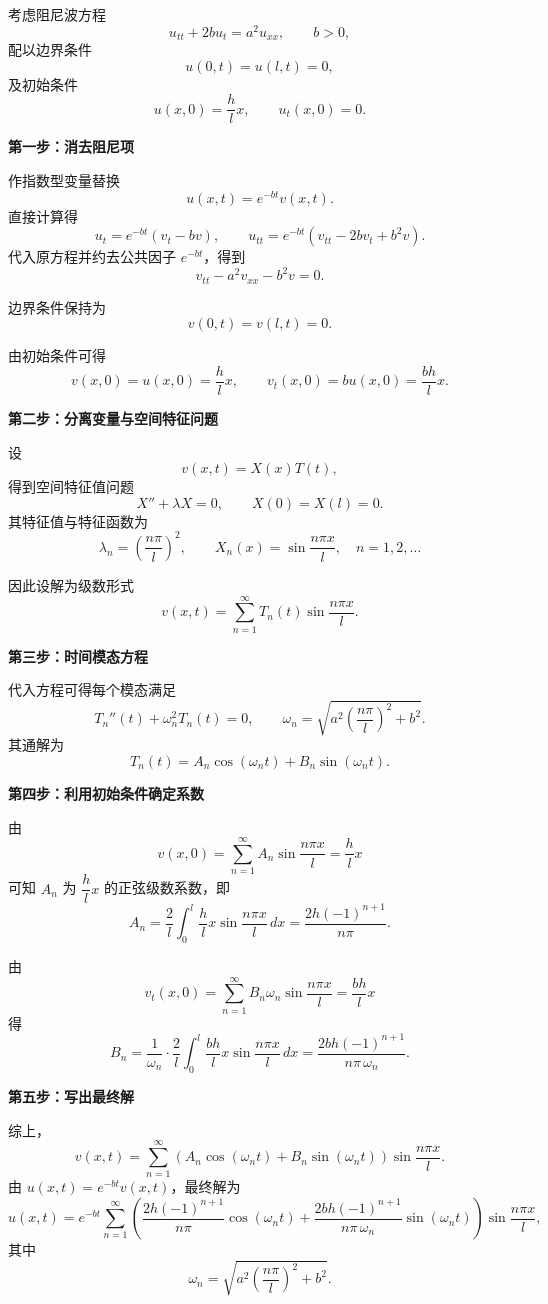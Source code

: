 \begin{solution}
考虑阻尼波方程
\[
u_{tt}+2bu_t=a^{2}u_{xx},\qquad b>0,
\]
配以边界条件
\[
u(0,t)=u(l,t)=0,
\]
及初始条件
\[
u(x,0)=\frac{h}{l}x,\qquad u_t(x,0)=0.
\]

\medskip
\noindent\textbf{第一步：消去阻尼项}

作指数型变量替换
\[
u(x,t)=e^{-bt}v(x,t).
\]
直接计算得
\[
u_t=e^{-bt}(v_t-bv),\qquad
u_{tt}=e^{-bt}(v_{tt}-2bv_t+b^2v).
\]
代入原方程并约去公共因子 $e^{-bt}$，得到
\[
v_{tt}-a^{2}v_{xx}-b^{2}v=0.
\]

边界条件保持为
\[
v(0,t)=v(l,t)=0.
\]

由初始条件可得
\[
v(x,0)=u(x,0)=\frac{h}{l}x,\qquad
v_t(x,0)=bu(x,0)=\frac{bh}{l}x.
\]

\medskip
\noindent\textbf{第二步：分离变量与空间特征问题}

设
\[
v(x,t)=X(x)T(t),
\]
得到空间特征值问题
\[
X''+\lambda X=0,\qquad X(0)=X(l)=0.
\]
其特征值与特征函数为
\[
\lambda_n=\left(\frac{n\pi}{l}\right)^2,
\qquad
X_n(x)=\sin\frac{n\pi x}{l},
\quad n=1,2,\dots
\]

因此设解为级数形式
\[
v(x,t)=\sum_{n=1}^{\infty} T_n(t)\sin\frac{n\pi x}{l}.
\]

\medskip
\noindent\textbf{第三步：时间模态方程}

代入方程可得每个模态满足
\[
T_n''(t)+\omega_n^2 T_n(t)=0,
\qquad
\omega_n=\sqrt{a^2\left(\frac{n\pi}{l}\right)^2+b^2}.
\]
其通解为
\[
T_n(t)=A_n\cos(\omega_n t)+B_n\sin(\omega_n t).
\]

\medskip
\noindent\textbf{第四步：利用初始条件确定系数}

由
\[
v(x,0)=\sum_{n=1}^\infty A_n\sin\frac{n\pi x}{l}
=\frac{h}{l}x
\]
可知 $A_n$ 为 $\dfrac{h}{l}x$ 的正弦级数系数，即
\[
A_n=\frac{2}{l}\int_0^l \frac{h}{l}x\sin\frac{n\pi x}{l}\,dx
=\frac{2h(-1)^{n+1}}{n\pi}.
\]

由
\[
v_t(x,0)=\sum_{n=1}^\infty B_n\omega_n\sin\frac{n\pi x}{l}
=\frac{bh}{l}x
\]
得
\[
B_n=\frac{1}{\omega_n}\cdot
\frac{2}{l}\int_0^l \frac{bh}{l}x\sin\frac{n\pi x}{l}\,dx
=\frac{2bh(-1)^{n+1}}{n\pi\,\omega_n}.
\]

\medskip
\noindent\textbf{第五步：写出最终解}

综上，
\[
v(x,t)=
\sum_{n=1}^{\infty}
\left(
A_n\cos(\omega_n t)+B_n\sin(\omega_n t)
\right)
\sin\frac{n\pi x}{l}.
\]
由 $u(x,t)=e^{-bt}v(x,t)$，最终解为
\[
\boxed{
u(x,t)=e^{-bt}
\sum_{n=1}^{\infty}
\left(
\frac{2h(-1)^{n+1}}{n\pi}\cos(\omega_n t)
+\frac{2bh(-1)^{n+1}}{n\pi\,\omega_n}\sin(\omega_n t)
\right)
\sin\frac{n\pi x}{l},
}
\]
其中
\[
\omega_n=\sqrt{a^2\left(\frac{n\pi}{l}\right)^2+b^2}.
\]
\end{solution}



